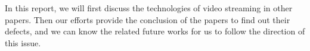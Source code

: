 In this report, we will first discuss the technologies of video
streaming in other papers. Then our efforts provide the conclusion
of the papers to find out their defects, and we can know the
related future works for us to follow the direction of this issue.